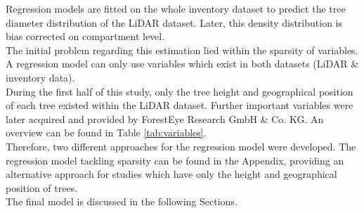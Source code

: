 
Regression models are fitted on the whole inventory dataset to predict the tree diameter distribution of the LiDAR dataset. Later, this density distribution is bias corrected on compartment level.\\

The initial problem regarding this estimation lied within the sparsity of variables.
A regression model can only use variables which exist in both datasets (LiDAR \& inventory data).\\

During the first half of this study, only the tree height and geographical position of each tree existed within the LiDAR
dataset. Further important variables were later acquired and provided by ForestEye Research GmbH \& Co. KG. An overview can be
found in Table \ref{tab:variables}.\\

Therefore, two different approaches for the regression model were developed. The regression model tackling
sparsity can be found in the Appendix, providing an alternative approach for studies which have only the height and geographical position of trees.\\

The final model is discussed in the following Sections.
